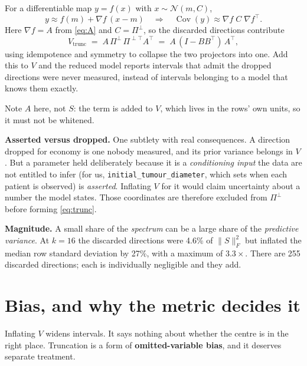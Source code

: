 \documentclass[11pt]{article}
\newcommand{\Cov}{\operatorname{Cov}}
\begin{document}
For a differentiable map $y = f(x)$ with $x \sim \mathcal N(m, C)$,
\[
  y \approx f(m) + \nabla f\,(x-m)
  \quad\Longrightarrow\quad
  \Cov(y) \approx \nabla f \; C \; \nabla f^{\top}.
\]
Here $\nabla f = A$ from \eqref{eq:A} and $C = \Pi^{\perp}$, so the discarded
directions contribute
\begin{equation}
  V_{\text{trunc}}
    \;=\; A\,\Pi^{\perp}\,\Pi^{\perp\top} A^{\top}
    \;=\; A\,(I - BB^{\top})\,A^{\top},
  \label{eq:trunc}
\end{equation}
using idempotence and symmetry to collapse the two projectors into one. Add this
to $V$ and the reduced model reports intervals that admit the dropped directions
were never measured, instead of intervals belonging to a model that knows them
exactly.

Note $A$ here, not $S$: the term is added to $V$, which lives in the rows' own
units, so it must not be whitened.

\medskip
\noindent\textbf{Asserted versus dropped.} One subtlety with real consequences.
A direction dropped for economy is one nobody measured, and its prior variance
belongs in $V$. But a parameter held deliberately because it is a
\emph{conditioning input} the data are not entitled to infer (for us,
\texttt{initial\_tumour\_diameter}, which sets when each patient is observed) is
\emph{asserted}. Inflating $V$ for it would claim uncertainty about a number the
model states. Those coordinates are therefore excluded from $\Pi^{\perp}$ before
forming \eqref{eq:trunc}.

\medskip
\noindent\textbf{Magnitude.} A small share of the \emph{spectrum} can be a large
share of the \emph{predictive variance}. At $k=16$ the discarded directions were
4.6\% of $\|S\|_F^2$ but inflated the median row standard deviation by 27\%,
with a maximum of $3.3\times$. There are 255 discarded directions; each is
individually negligible and they add.

\section{Bias, and why the metric decides it}
\label{sec:bias}

Inflating $V$ widens intervals. It says nothing about whether the centre is in
the right place. Truncation is a form of \textbf{omitted-variable bias}, and it
deserves separate treatment.
\end{document}
